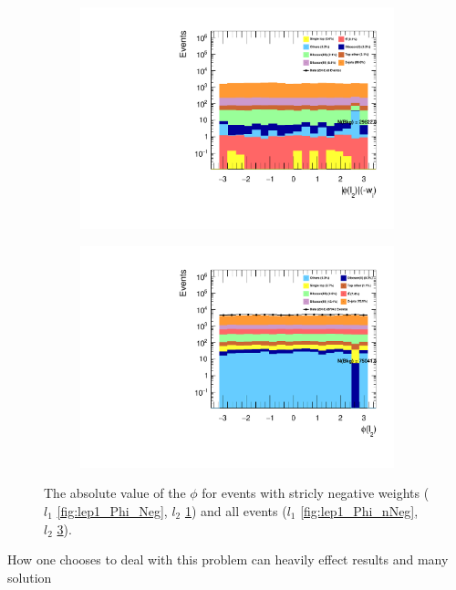 \begin{figure}
{\begin{subfigure}{.425\textwidth}
        \includegraphics[width=\textwidth]{Figures/FeaturesHistograms/lep2_Phi_Neg.pdf}
        \caption{}
        \label{fig:lep2_Phi_Neg}
    \end{subfigure}
    \hfill
    \begin{subfigure}{.425\textwidth}
        \includegraphics[width=\textwidth]{Figures/FeaturesHistograms/lep2_Phi_nNeg.pdf}
        \caption{}
        \label{fig:lep2_Phi_nNeg}
    \end{subfigure}
    }
    \caption{The absolute value of the $\phi$ for events with stricly negative weights 
    ($l_1$ \ref{fig:lep1_Phi_Neg}, $l_2$ \ref{fig:lep2_Phi_Neg}) and all events
    ($l_1$ \ref{fig:lep1_Phi_nNeg}, $l_2$ \ref{fig:lep2_Phi_nNeg}). }

\end{figure}
How one chooses to deal with this problem can heavily effect results and many solution 
